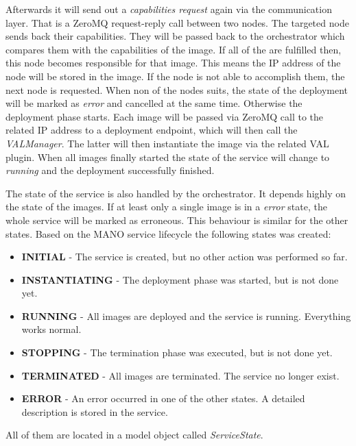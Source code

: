 Afterwards it will send out a \textit{capabilities request} again via the communication layer.
That is a ZeroMQ request-reply call between two nodes.
The targeted node sends back their capabilities.
They will be passed back to the orchestrator which compares them with the capabilities of the image.
If all of the are fulfilled then, this node becomes responsible for that image.
This means the \ac{IP} address of the node will be stored in the image.
If the node is not able to accomplish them, the next node is requested.
When non of the nodes suits, the state of the deployment will be marked as \textit{error} and cancelled at the same time.
Otherwise the deployment phase starts.
Each image will be passed via ZeroMQ call to the related \ac{IP} address to a deployment endpoint, which will then call the \textit{VALManager}.
The latter will then instantiate the image via the related \ac{VAL} plugin.
When all images finally started the state of the service will change to \textit{running} and the deployment successfully finished.\newline

The state of the service is also handled by the orchestrator.
It depends highly on the state of the images.
If at least only a single image is in a \textit{error} state, the whole service will be marked as erroneous.
This behaviour is similar for the other states.
Based on the \ac{MANO} service lifecycle the following states was created:\newline

\begin{itemize}
  \item \textbf{INITIAL} - The service is created, but no other action was performed so far.
  \item \textbf{INSTANTIATING} - The deployment phase was started, but is not done yet.
  \item \textbf{RUNNING} - All images are deployed and the service is running. Everything works normal.
  \item \textbf{STOPPING} - The termination phase was executed, but is not done yet.
  \item \textbf{TERMINATED} - All images are terminated. The service no longer exist.
  \item \textbf{ERROR} - An error occurred in one of the other states. A detailed description is stored in the service.
\end{itemize}
\bigskip

All of them are located in a model object called \textit{ServiceState}.


